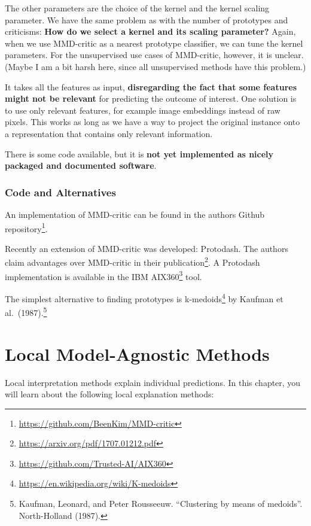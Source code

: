 \documentclass[
  10pt,
]{scrbook}
\renewcommand{\href}[2]{#2\footnote{\url{#1}}}
\begin{document}
The other parameters are the choice of the kernel and the kernel scaling parameter.
We have the same problem as with the number of prototypes and criticisms:
\textbf{How do we select a kernel and its scaling parameter?}
Again, when we use MMD-critic as a nearest prototype classifier, we can tune the kernel parameters.
For the unsupervised use cases of MMD-critic, however, it is unclear.
(Maybe I am a bit harsh here, since all unsupervised methods have this problem.)

It takes all the features as input, \textbf{disregarding the fact that some features might not be relevant} for predicting the outcome of interest.
One solution is to use only relevant features, for example image embeddings instead of raw pixels.
This works as long as we have a way to project the original instance onto a representation that contains only relevant information.

There is some code available, but it is \textbf{not yet implemented as nicely packaged and documented software}.

\hypertarget{code-and-alternatives}{%
\subsection{Code and Alternatives}\label{code-and-alternatives}}

An implementation of MMD-critic can be found in \href{https://github.com/BeenKim/MMD-critic}{the authors Github repository}.

Recently an extension of MMD-critic was developed: Protodash.
The authors claim advantages over MMD-critic in their \href{https://arxiv.org/pdf/1707.01212.pdf}{publication}.
A Protodash implementation is available in the \href{https://github.com/Trusted-AI/AIX360}{IBM AIX360} tool.

The simplest alternative to finding prototypes is \href{https://en.wikipedia.org/wiki/K-medoids}{k-medoids} by Kaufman et al.~(1987).\footnote{Kaufman, Leonard, and Peter Rousseeuw. ``Clustering by means of medoids''. North-Holland (1987).}

\hypertarget{local-methods}{%
\chapter{Local Model-Agnostic Methods}\label{local-methods}}

Local interpretation methods explain individual predictions.
In this chapter, you will learn about the following local explanation methods:
\end{document}

